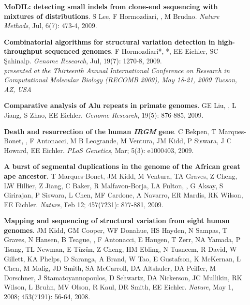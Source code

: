 \vspace{-.2cm}
    {\bf MoDIL: detecting small indels from clone-end sequencing with mixtures of distributions}.
    S Lee, F Hormozdiari, \calkan{}, M Brudno.
    {\em Nature Methods},  Jul, 6(7): 473-4, 2009.
    
\clearpage


\vspace{-.2cm}
{\bf  Combinatorial algorithms for structural variation detection in high-throughput sequenced genomes}.
F Hormozdiari*, \calkan{}*, EE Eichler, SC \c{S}ahinalp. 
{\em Genome Research}, Jul, 19(7): 1270-8, 2009.\\
\hspace*{1cm} {\footnotesize {\it presented at the
 Thirteenth Annual International Conference on Research in Computational Molecular 
Biology (RECOMB 2009), May 18-21, 2009 Tucson, AZ, USA}}



\vspace{-.2cm}

{\bf Comparative analysis of Alu repeats in primate genomes}.  GE Liu, \calkan{}, L Jiang, S Zhao, EE Eichler. 
{\em Genome Research}, 19(5): 876-885, 2009.




\vspace{-.2cm}
{\bf Death and resurrection of the human {\em IRGM} gene}. C Bekpen, T Marques-Bonet,
\calkan{}, F Antonacci, M B Leogrande, M Ventura, JM Kidd, P Siswara, J C Howard, EE Eichler. {\em PLoS Genetics}, Mar; 5(3): e1000403, 2009.

\vspace{-.2cm}

{\bf A burst of segmental duplications in the genome of the African great ape ancestor}. T Marques-Bonet, JM Kidd, M Ventura, TA Graves, Z Cheng, LW Hillier, Z Jiang, 
C Baker, R Malfavon-Borja, LA Fulton, \calkan{}, G Aksay, S Girirajan,
 P Siswara, L Chen, MF Cardone, A Navarro, ER Mardis,
 RK Wilson, EE Eichler. {\em Nature}, Feb 12; 457(7231): 877-881, 2009.


\vspace{-.2cm}
 {\bf Mapping and sequencing of structural variation from eight human genomes}.
 JM Kidd, GM Cooper, WF Donahue, HS Hayden, 
 N Sampas, T Graves, N Hansen, B Teague, \calkan{},  F Antonacci, 
 E Haugen, T Zerr, NA Yamada, P Tsang,  TL Newman, E T\"{u}z\"{u}n, 
 Z Cheng, HM Ebling, N Tusneem, R David, W Gillett, KA Phelps, 
 D Saranga, A Brand, W Tao, E Gustafson, K McKernan, L Chen, 
 M Malig, JD Smith, SA McCarroll, DA Altshuler,  
 DA Peiffer, M Dorschner, J Stamatoyannopoulos, D Schwartz,  
 DA Nickerson, JC Mullikin, RK Wilson, L Bruhn, 
 MV Olson, R Kaul, DR Smith, EE Eichler.
 {\em Nature}, May 1, 2008; 453(7191): 56-64, 2008.


